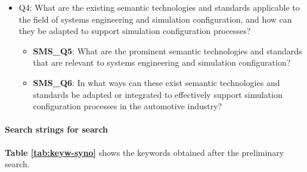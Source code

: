 \begin{itemize}
                \item Q4: What are the existing semantic technologies and standards applicable to the field of systems engineering and simulation configuration, and how can they be adapted to support simulation configuration processes?
                    \begin{itemize}
                        \item \textbf{SMS\_Q5}: What are the prominent semantic technologies and standards that are relevant to systems engineering and simulation configuration?

                        \item \textbf{SMS\_Q6}: In what ways can these exist semantic technologies and standards be adapted or integrated to effectively support simulation configuration processes in the automotive industry?
                    \end{itemize}

            \end{itemize}

            
            \paragraph{Search strings for search}
            \textbf{Table \ref{tab:keyw-syno}} shows the keywords obtained after the preliminary search.\\

